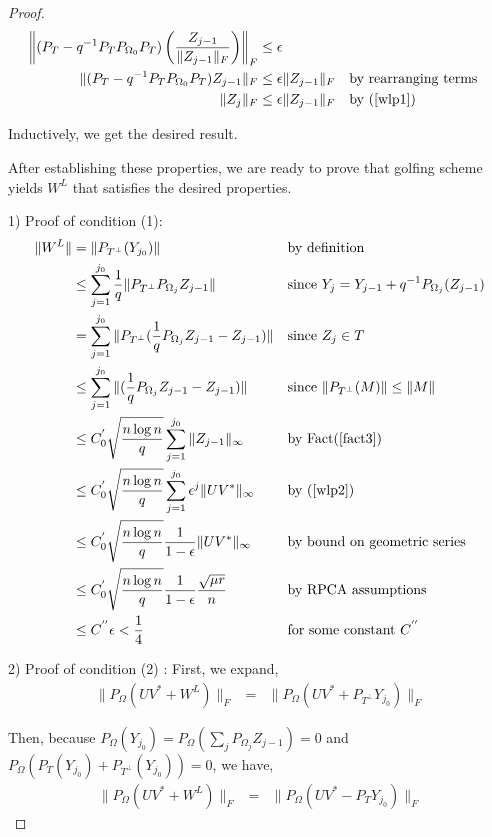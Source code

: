 \begin{proof}
\begin{align*}
\left\|(P_{T}-q^{-1}P_{T}P_{\Omega_{0}}P_{T}) \left( \frac{Z_{j-1}}{\|Z_{j-1}\|_{F}} \right) \right\|_{F} & \le \epsilon\\
\|(P_{T}-q^{-1}P_{T}P_{\Omega_{0}}P_{T})Z_{j-1}\|_{F} & \le \epsilon\|Z_{j-1}\|_{F} && \text{by rearranging terms}\\
\|Z_{j}\|_{F} & \le \epsilon\|Z_{j-1}\|_{F} &&\text{by (\ref{wlp1}) }
\end{align*}

Inductively, we get the desired result.

After establishing these properties, we are ready to prove that golfing scheme yields $W^{L}$ that satisfies the desired properties.

1) Proof of condition (1):
\[
\begin{aligned}
\|W^{L}\| & = \|P_{T^{\bot}}(Y_{j_{0}})\| && \text{by definition}\\
 & \le \sum_{j=1}^{j_{0}}\frac{1}{q}\|P_{T^{\bot}}P_{\Omega_{j}}Z_{j-1}\| 
 &&\text{since } Y_{j} = Y_{j-1} + q^{-1} P_{\Omega_{j}}(Z_{j-1})\\
 & = \sum_{j=1}^{j_{0}}\|P_{T^{\bot}}(\frac{1}{q}P_{\Omega_{j}}Z_{j-1}-Z_{j-1})\| 
 &&\text{since }Z_{j}\in T\\
 & \le \sum_{j=1}^{j_{0}}\|(\frac{1}{q}P_{\Omega_{j}}Z_{j-1}-Z_{j-1})\| 
 &&\text{since }\|P_{T^{\bot}}(M)\|\le\|M\|\\
 & \le C_{0}^{'}\sqrt{\frac{n\log n}{q}}\sum_{j=1}^{j_{0}}\|Z_{j-1}\|_{\infty} 
 &&\text{by Fact(\ref{fact3})}\\
 & \le C_{0}^{'}\sqrt{\frac{n\log n}{q}}\sum_{j=1}^{j_{0}}\epsilon^{j}\|UV^{*}\|_{\infty} 
 &&\text{by (\ref{wlp2})}\\
 & \le C_{0}^{'}\sqrt{\frac{n\log n}{q}}\frac{1}{1-\epsilon}\|UV^{*}\|_{\infty} 
 &&\text{by bound on geometric series}\\
 & \le C_{0}^{'}\sqrt{\frac{n\log n}{q}}\frac{1}{1-\epsilon}\frac{\sqrt{\mu r}}{n} 
 &&\text{by RPCA assumptions}\\
 & \le C^{''}\epsilon<\frac{1}{4} 
 &&\text{for some constant }C^{''}
\end{aligned}
\]

2) Proof of condition (2) : First, we expand,
\begin{eqnarray*}
\|P_{\Omega}(UV^{*}+W^{L})\|_{F} & = & \|P_{\Omega}(UV^{*}+P_{T^{\bot}}Y_{j_{0}})\|_{F}
\end{eqnarray*}

Then, because $P_{\Omega}(Y_{j_{0}})=P_{\Omega}(\sum_{j}P_{\Omega_{j}}Z_{j-1})=0$ and $P_{\Omega}(P_{T}(Y_{j_{0}})+P_{T^{\bot}}(Y_{j_{0}}))=0$, we have,
\begin{eqnarray*}
\|P_{\Omega}(UV^{*}+W^{L})\|_{F} & = & \|P_{\Omega}(UV^{*}-P_{T}Y_{j_{0}})\|_{F}
\end{eqnarray*}



\end{proof}
